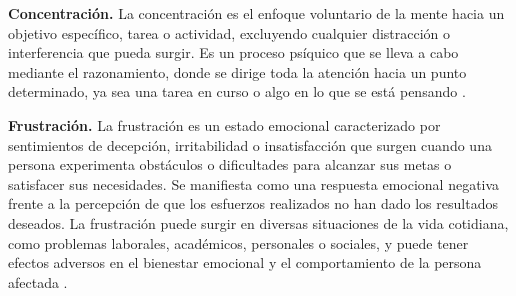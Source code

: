 \textbf{Concentración.} La concentración es el enfoque voluntario de la mente hacia un objetivo específico, tarea o actividad, excluyendo cualquier distracción o interferencia que pueda surgir. Es un proceso psíquico que se lleva a cabo mediante el razonamiento, donde se dirige toda la atención hacia un punto determinado, ya sea una tarea en curso o algo en lo que se está pensando \cite{Concentracion2023}.

\textbf{Frustración.} La frustración es un estado emocional caracterizado por sentimientos de decepción, irritabilidad o insatisfacción que surgen cuando una persona experimenta obstáculos o dificultades para alcanzar sus metas o satisfacer sus necesidades. Se manifiesta como una respuesta emocional negativa frente a la percepción de que los esfuerzos realizados no han dado los resultados deseados. La frustración puede surgir en diversas situaciones de la vida cotidiana, como problemas laborales, académicos, personales o sociales, y puede tener efectos adversos en el bienestar emocional y el comportamiento de la persona afectada \cite{Kamenetzky2009}.